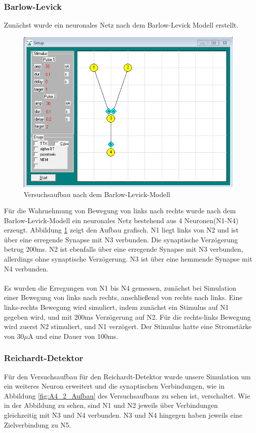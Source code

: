 \documentclass[a4paper]{article}
\begin{document}
\subsubsection{Barlow-Levick}
Zunächst wurde ein neuronales Netz nach dem Barlow-Levick Modell erstellt.\\

\begin{figure}[H]
    \centering
    \includegraphics[scale=0.6]{images/Aufgabe4_1_Aufbau.png}
    \caption{Versuchsaufbau nach dem Barlow-Levick-Modell}
    \label{fig:A4_1_Aufbau}
\end{figure}
\newpage
\noindent Für die Wahrnehmung von Bewegung von links nach rechts wurde nach dem Barlow-Levick-Modell ein neuronales Netz bestehend aus 4 Neuronen(N1-N4) erzeugt. Abbildung \ref{fig:A4_1_Aufbau} zeigt den Aufbau grafisch. N1 liegt links von N2 und ist über eine erregende Synapse mit N3 verbunden. Die synaptische Verzögerung betrug 200ms. N2 ist ebenfalls über eine erregende Synapse mit N3 verbunden, allerdings ohne synaptische Verzögerung. N3 ist über eine hemmende Synapse mit N4 verbunden.\\ \\
Es wurden die Erregungen von N1 bis N4 gemessen, zunächst bei Simulation einer Bewegung von links nach rechts, anschließend von rechts nach links. Eine links-rechts Bewegung wird simuliert, indem zunächst ein Stimulus auf N1 gegeben wird, und mit 200ms Verzögerung auf N2. Für die rechts-links Bewegung wird zuerst N2 stimuliert, und N1 verzögert. Der Stimulus hatte eine Stromstärke von 30\(\mu\)A und eine Dauer von 100ms.\\
\subsubsection{Reichardt-Detektor}
Für den Versuchsaufbau für den Reichardt-Detektor wurde unsere Simulation um ein weiteres Neuron erweitert und die synaptischen Verbindungen, wie in Abbildung \ref{fig:A4_2_Aufbau} des Versuchsaufbaus zu sehen ist, verschaltet. Wie in der Abbildung zu sehen, sind N1 und N2 jeweils über Verbindungen gleichzeitig mit N3 und N4 verbunden. N3 und N4 hingegen haben jeweils eine Zielverbindung zu N5. 
\end{document}
